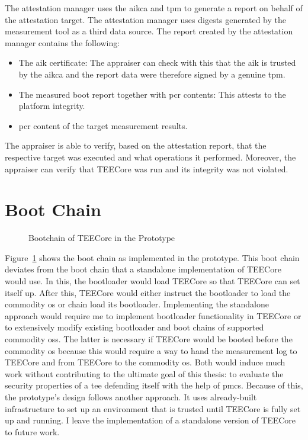The attestation manager uses the \gls{aikca} and \gls{tpm} to generate a report
on behalf of the attestation target. The attestation manager uses digests
generated by the measurement tool as a third data source. The report created by
the attestation manager contains the following:
\begin{itemize}
  \item The \gls{aik} certificate: The appraiser can check with this that the
    \gls{aik} is trusted by the \gls{aikca} and the report data were
    therefore signed by a genuine \gls{tpm}.
  \item The measured boot report together with \gls{pcr} contents: This attests
    to the platform integrity.
  \item \gls{pcr} content of the target measurement results.
\end{itemize}

The appraiser is able to verify, based on the attestation report, that the
respective target was executed and what operations it performed. Moreover, the
appraiser can verify that TEECore was run and its integrity was not
violated.

\section{Boot Chain}
\label{sec:30:tee_boot_chain}
\begin{figure}
  \begin{center}
    
    \caption{Bootchain of TEECore in the Prototype}
    \label{fig:30:tee_bootchain}
  \end{center}
\end{figure}
Figure~\ref{fig:30:tee_bootchain} shows the boot chain as implemented in the
prototype. This boot chain deviates from the boot chain that a standalone
implementation of TEECore would use. In this, the bootloader would load TEECore
so that TEECore can set itself up. After this, TEECore would either instruct the
bootloader to load the commodity \gls{os} or chain load its bootloader.
Implementing the standalone approach would require me to implement bootloader
functionality in TEECore or to extensively modify existing bootloader and boot
chains of supported commodity \glspl{os}. The latter is necessary if TEECore
would be booted before the commodity \gls{os} because this would require a way
to hand the measurement log to TEECore and from TEECore to the commodity
\gls{os}. Both would induce much work without contributing to the ultimate goal
of this thesis: to evaluate the security properties of a \gls{tee} defending
itself with the help of \glspl{pmc}. Because of this, the prototype's design
follows another approach. It uses already-built infrastructure to set up an
environment that is trusted until TEECore is fully set up and running. I leave
the implementation of a standalone version of TEECore to future work.\\

